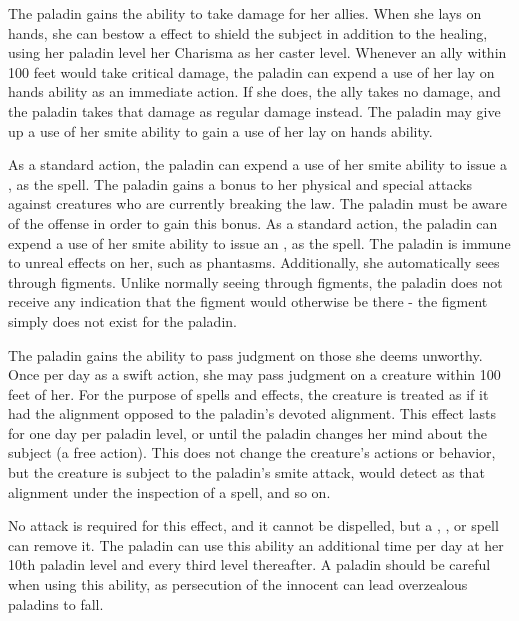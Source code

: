 

 The paladin gains the ability to take damage for her allies. When she lays on hands, she can bestow a  effect to shield the subject in addition to the healing, using her paladin level \add her Charisma as her caster level.
 Whenever an ally within 100 feet would take critical damage, the paladin can expend a use of her lay on hands ability as an immediate action. If she does, the ally takes no damage, and the paladin takes that damage as regular damage instead.
 The paladin may give up a use of her smite ability to gain a use of her lay on hands ability.

 As a standard action, the paladin can expend a use of her smite ability to issue a , as the spell.
 The paladin gains a  bonus to her physical and special attacks against creatures who are currently breaking the law. The paladin must be aware of the offense in order to gain this bonus.
 As a standard action, the paladin can expend a use of her smite ability to issue an , as the spell.
 The paladin is immune to unreal effects on her, such as phantasms. Additionally, she automatically sees through figments. Unlike normally seeing through figments, the paladin does not receive any indication that the figment would otherwise be there - the figment simply does not exist for the paladin.


 The paladin gains the ability to pass judgment on those she deems unworthy. Once per day as a swift action, she may pass judgment on a creature within 100 feet of her. For the purpose of spells and effects, the creature is treated as if it had the alignment opposed to the paladin's devoted alignment. This effect lasts for one day per paladin level, or until the paladin changes her mind about the subject (a free action). This does not change the creature's actions or behavior, but the creature is subject to the paladin's smite attack, would detect as that alignment under the inspection of a  spell, and so on.

No attack is required for this effect, and it cannot be dispelled, but a , , or  spell can remove it. The paladin can use this ability an additional time per day at her 10th paladin level and every third level thereafter. A paladin should be careful when using this ability, as persecution of the innocent can lead overzealous paladins to fall.


